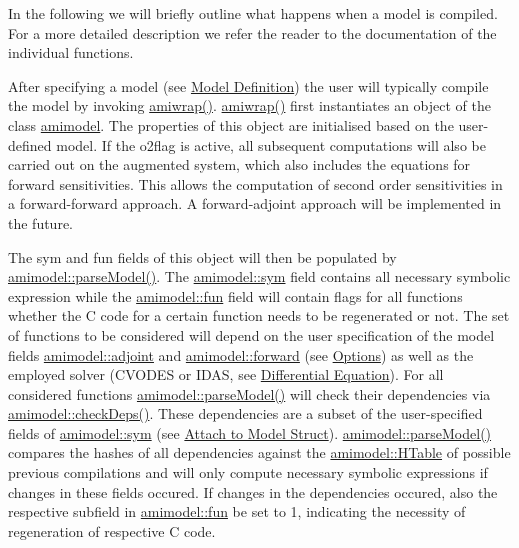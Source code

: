 In the following we will briefly outline what happens when a model is compiled. For a more detailed description we refer the reader to the documentation of the individual functions.

After specifying a model (see \hyperlink{def_simu_definition}{Model Definition}) the user will typically compile the model by invoking \hyperlink{amiwrap_8m_a183dd11adc4bd525147faa2590ea325b}{amiwrap()}. \hyperlink{amiwrap_8m_a183dd11adc4bd525147faa2590ea325b}{amiwrap()} first instantiates an object of the class \hyperlink{classamimodel}{amimodel}. The properties of this object are initialised based on the user-\/defined model. If the o2flag is active, all subsequent computations will also be carried out on the augmented system, which also includes the equations for forward sensitivities. This allows the computation of second order sensitivities in a forward-\/forward approach. A forward-\/adjoint approach will be implemented in the future.

The sym and fun fields of this object will then be populated by \hyperlink{classamimodel_a68efdc6ed5d618672bea1556209e5568}{amimodel\+::parse\+Model()}. The \hyperlink{classamimodel_a3c48fff3d28406486a4f1b5e18da7ca6}{amimodel\+::sym} field contains all necessary symbolic expression while the \hyperlink{classamimodel_a743fa290dbc0a67a3843d5ab0426e9b4}{amimodel\+::fun} field will contain flags for all functions whether the C code for a certain function needs to be regenerated or not. The set of functions to be considered will depend on the user specification of the model fields \hyperlink{classamimodel_ab6d500b41cf50693452415caca31d32e}{amimodel\+::adjoint} and \hyperlink{classamimodel_a81e42e48c9c72814166c8f7cd414ce24}{amimodel\+::forward} (see \hyperlink{def_simu_options}{Options}) as well as the employed solver (C\+V\+O\+D\+E\+S or I\+D\+A\+S, see \hyperlink{def_simu_rhs}{Differential Equation}). For all considered functions \hyperlink{classamimodel_a68efdc6ed5d618672bea1556209e5568}{amimodel\+::parse\+Model()} will check their dependencies via \hyperlink{classamimodel_aa04dcfc1d2188cae948a75ebd46a6e03}{amimodel\+::check\+Deps()}. These dependencies are a subset of the user-\/specified fields of \hyperlink{classamimodel_a3c48fff3d28406486a4f1b5e18da7ca6}{amimodel\+::sym} (see \hyperlink{def_simu_attach}{Attach to Model Struct}). \hyperlink{classamimodel_a68efdc6ed5d618672bea1556209e5568}{amimodel\+::parse\+Model()} compares the hashes of all dependencies against the \hyperlink{classamimodel_aafe6335df413dd688a2f44efba012cf1}{amimodel\+::\+H\+Table} of possible previous compilations and will only compute necessary symbolic expressions if changes in these fields occured. If changes in the dependencies occured, also the respective subfield in \hyperlink{classamimodel_a743fa290dbc0a67a3843d5ab0426e9b4}{amimodel\+::fun} be set to 1, indicating the necessity of regeneration of respective C code.

